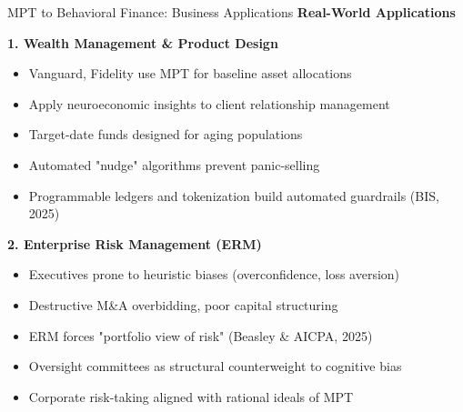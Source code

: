 \documentclass[aspectratio=169,10pt]{beamer}
\renewcommand{\small}{\fontsize{7pt}{8.5pt}\selectfont}
\renewcommand{\large}{\fontsize{9pt}{11pt}\selectfont}
\newcommand{\question}[1]{{\large\bfseries\color{crimson}#1}}
\begin{document}
	\begin{frame}{MPT to Behavioral Finance: Business Applications}
		\question{Real-World Applications}
		\small
		
		\textbf{1. Wealth Management \& Product Design}
		\begin{itemize}
			\item Vanguard, Fidelity use MPT for baseline asset allocations
			\item Apply neuroeconomic insights to client relationship management
			\item Target-date funds designed for aging populations
			\item Automated "nudge" algorithms prevent panic-selling
			\item Programmable ledgers and tokenization build automated guardrails (BIS, 2025)
		\end{itemize}
		
		\vspace{0.1cm}
		\textbf{2. Enterprise Risk Management (ERM)}
		\begin{itemize}
			\item Executives prone to heuristic biases (overconfidence, loss aversion)
			\item Destructive M\&A overbidding, poor capital structuring
			\item ERM forces "portfolio view of risk" (Beasley \& AICPA, 2025)
			\item Oversight committees as structural counterweight to cognitive bias
			\item Corporate risk-taking aligned with rational ideals of MPT
		\end{itemize}
	\end{frame}
	
	
\end{document}
